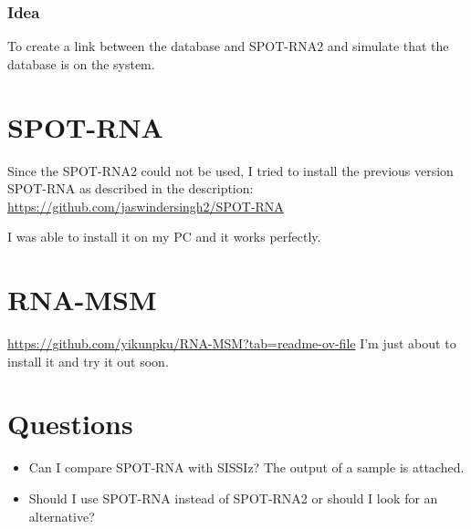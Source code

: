 \documentclass{article}
\begin{document}
\subsubsection{Idea}
To create a link between the database and SPOT-RNA2 and simulate that the database is on the system. 

\section{SPOT-RNA}

Since the SPOT-RNA2 could not be used, I tried to install the previous version SPOT-RNA as described in the description:
\singlespacing
\url{https://github.com/jaswindersingh2/SPOT-RNA}
\singlespacing

I was able to install it on my PC and it works perfectly. 

\section{RNA-MSM}

\url{https://github.com/yikunpku/RNA-MSM?tab=readme-ov-file}
\singlespacing
I'm just about to install it and try it out soon.

\section{Questions}

\begin{itemize}
    \item Can I compare SPOT-RNA with SISSIz? The output of a sample is attached.
    \item Should I use SPOT-RNA instead of SPOT-RNA2 or should I look for an alternative?
\end{itemize}
\end{document}
